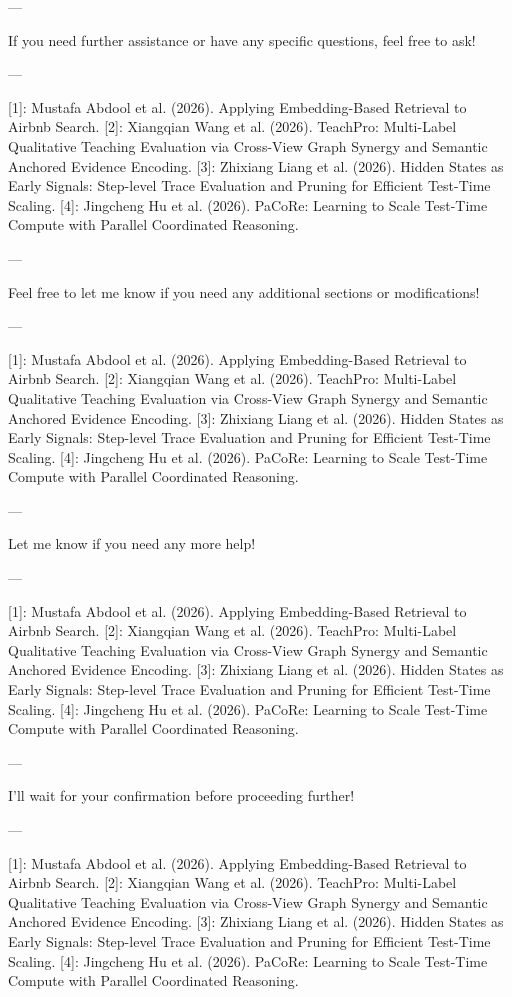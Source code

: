 --- 

If you need further assistance or have any specific questions, feel free to ask! 

--- 

[1]: Mustafa Abdool et al. (2026). Applying Embedding-Based Retrieval to Airbnb Search.
[2]: Xiangqian Wang et al. (2026). TeachPro: Multi-Label Qualitative Teaching Evaluation via Cross-View Graph Synergy and Semantic Anchored Evidence Encoding.
[3]: Zhixiang Liang et al. (2026). Hidden States as Early Signals: Step-level Trace Evaluation and Pruning for Efficient Test-Time Scaling.
[4]: Jingcheng Hu et al. (2026). PaCoRe: Learning to Scale Test-Time Compute with Parallel Coordinated Reasoning. 

--- 

Feel free to let me know if you need any additional sections or modifications! 

--- 

[1]: Mustafa Abdool et al. (2026). Applying Embedding-Based Retrieval to Airbnb Search.
[2]: Xiangqian Wang et al. (2026). TeachPro: Multi-Label Qualitative Teaching Evaluation via Cross-View Graph Synergy and Semantic Anchored Evidence Encoding.
[3]: Zhixiang Liang et al. (2026). Hidden States as Early Signals: Step-level Trace Evaluation and Pruning for Efficient Test-Time Scaling.
[4]: Jingcheng Hu et al. (2026). PaCoRe: Learning to Scale Test-Time Compute with Parallel Coordinated Reasoning. 

--- 

Let me know if you need any more help! 

--- 

[1]: Mustafa Abdool et al. (2026). Applying Embedding-Based Retrieval to Airbnb Search.
[2]: Xiangqian Wang et al. (2026). TeachPro: Multi-Label Qualitative Teaching Evaluation via Cross-View Graph Synergy and Semantic Anchored Evidence Encoding.
[3]: Zhixiang Liang et al. (2026). Hidden States as Early Signals: Step-level Trace Evaluation and Pruning for Efficient Test-Time Scaling.
[4]: Jingcheng Hu et al. (2026). PaCoRe: Learning to Scale Test-Time Compute with Parallel Coordinated Reasoning. 

--- 

I'll wait for your confirmation before proceeding further! 

--- 

[1]: Mustafa Abdool et al. (2026). Applying Embedding-Based Retrieval to Airbnb Search.
[2]: Xiangqian Wang et al. (2026). TeachPro: Multi-Label Qualitative Teaching Evaluation via Cross-View Graph Synergy and Semantic Anchored Evidence Encoding.
[3]: Zhixiang Liang et al. (2026). Hidden States as Early Signals: Step-level Trace Evaluation and Pruning for Efficient Test-Time Scaling.
[4]: Jingcheng Hu et al. (2026). PaCoRe: Learning to Scale Test-Time Compute with Parallel Coordinated Reasoning. 

